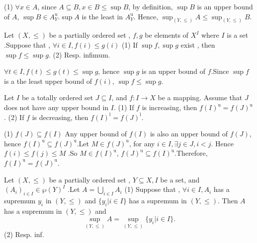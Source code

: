 \begin{proofenv}
    \quad
    \newline
    (1) $\forall x\in A$, since $A\subseteq B, x\in B \le \sup B$, by definition,  $\sup B$ is an upper bound of $A$, $\sup B\in A_Y^\mathrm{u}$.$\sup A$ is the least in $A_Y^\mathrm{u}$. Hence, $\sup_{(Y, \le)}A \le \sup_{(Y, \le)}B$.
\end{proofenv}
\begin{propositionenv}\label{proposition4.5.3}
    Let $(X, \le )$ be a partially ordered set , $f, g$ be elements of $X^I$ where $I$ is a set .Suppose that , $\forall i\in  I , f(i)\le g(i)$
 \newline
 (1) If $\sup f, \sup g$ exist , then $\sup f\le\sup g$.
 \newline
 (2) Resp. infimum.
\end{propositionenv}
\begin{proofenv}
    $\forall t\in I, f(t)\le g(t)\le \sup g$, hence $\sup g$ is an upper bound of $f$.Since $\sup f $ is a the least upper bound of $f(i)$, $\sup f\le\sup g$.
\end{proofenv}
\begin{propositionenv}
    Let $I$ be a totally ordered set $J\subseteq I $, and $f:I\rightarrow X $ be a mapping. Assume that $J$ does not have any upper bound in $I$.
    \newline 
    (1) If $f$ is increasing,  then $f(I)^\mathrm{u}=f(J)^\mathrm{u}$.
    \newline
    (2) If $f$ is decreasing,  then $f(I)^\mathrm{l}=f(J)^\mathrm{l}$.
\end{propositionenv}
\begin{proofenv}
    \quad 
    \newline
    (1) $f(J)\subseteq f(I)$ Any upper bound of $f(I)$ is also an upper bound of $f(J)$, hence $f(I)^\mathrm{u}\subseteq f(J)^\mathrm{u}$.Let $M\in f(J)^\mathrm{u}$, for any $i\in I, \exists j\in J, i<j$. Hence $f(i)\le f(j)\le M$ .So $M\in f(I)^\mathrm{u}$, $f(J)^\mathrm{u}\subseteq f(I)^\mathrm{u}$.Therefore, $f(I)^\mathrm{u}=f(J)^\mathrm{u}$.
\end{proofenv}
\begin{propositionenv}
    Let $(X, \le)$ be a partially ordered set , $Y\subseteq X, I$ be a set,  and $(A_i)_{i\in I}\in \wp (Y)^I$ .Let $A=\bigcup _{i\in I}A_i$
    \newline
    (1) Suppose that , $\forall i \in I, A_i$ has a supremum $y_i$ in $(Y, \le)$ and $\{y_i|i\in I\}$ has a supremum in $(Y, \le)$. Then $A$ has a supremum in $(Y, \le )$ and $$\sup_{(Y, \le)}A=\sup_{(Y, \le)}\{y_i|i\in I\}.$$
    \newline
    (2) Resp. inf.
\end{propositionenv}
